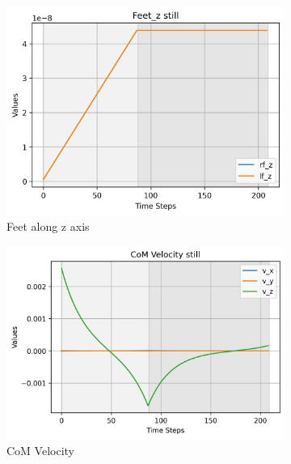 \documentclass[main.tex]{subfiles}
\begin{document}
\begin{figure}[htbp]
    \centering
    \begin{subfigure}[b]{0.32\textwidth}
        \centering
        \includegraphics[width=\textwidth]{figures/Feet_z still.png}
        \caption{Feet along z axis}
        \label{fig:sub1}
    \end{subfigure}
    \hfill
    \begin{subfigure}[b]{0.32\textwidth}
        \centering
        \includegraphics[width=\textwidth]{figures/CoM Velocity still.png}
        \caption{CoM Velocity}
        \label{fig:sub2}
    \end{subfigure}
    \hfill
    \begin{subfigure}[b]{0.32\textwidth}
        \centering

\end{subfigure}
\end{figure}
\end{document}
